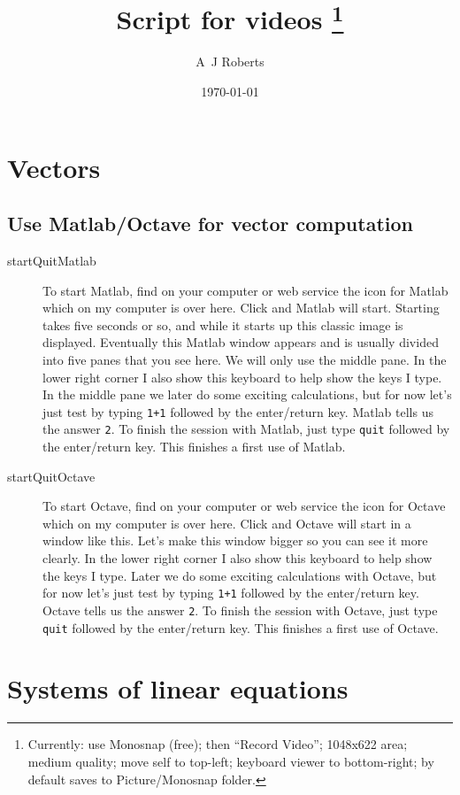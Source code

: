 \documentclass[12pt,a5paper,smallborder]{refrep}
\title{Script for videos
\footnote{Currently: use Monosnap (free); then ``Record Video''; 1048x622 area; medium quality; move self to top-left; keyboard viewer to bottom-right; by default saves to Picture\slash Monosnap folder.}}
\author{A~J Roberts}
\date{\today}
\begin{document}
\maketitle
\tableofcontents

\chapter{Vectors}


\section{Use Matlab/Octave for vector computation}

\begin{description}
\item[startQuitMatlab]
To start Matlab, find on your computer or web service the icon for Matlab which on my computer is over here.  
Click and Matlab will start.  
Starting takes five seconds or so, and while it starts up this classic image is displayed.  
Eventually this Matlab window appears and is usually divided into five panes that you see here.  
We will only use the middle pane.  
In the lower right corner I also show this keyboard to help show the keys I type.  
In the middle pane we later do some exciting calculations, but for now let's just test by typing \verb|1+1| followed by the enter\slash return key.  
Matlab tells us the answer \verb|2|.  
To finish the session with Matlab, just type \verb|quit| followed by the enter\slash return key.  
This finishes a first use of Matlab.



\item[startQuitOctave]
To start Octave, find on your computer or web service the icon for Octave which on my computer is over here.  
Click and Octave will start in a window like this.  
Let's make this window bigger so you can see it more clearly.
In the lower right corner I also show this keyboard to help show the keys I type.  
Later we do some exciting calculations with Octave, but for now let's just test by typing \verb|1+1| followed by the enter\slash return key.  
Octave tells us the answer \verb|2|.  
To finish the session with Octave, just type \verb|quit| followed by the enter\slash return key.  
This finishes a first use of Octave.


\end{description}





\chapter{Systems of linear equations}
\end{document}
